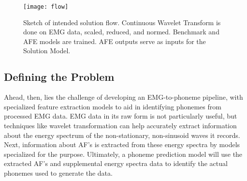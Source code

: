 \documentclass[conference]{IEEEtran}
\begin{document}

\begin{figure}[!t]
\centering
\texttt{[image: flow]}
\caption{Sketch of intended solution flow. Continuous Wavelet Transform is done on EMG data, scaled, reduced, and normed. Benchmark and AFE models are trained. AFE outputs serve as inputs for the Solution Model.}
\label{fig_flow}
\end{figure}

\subsection{Defining the Problem}
Ahead, then, lies the challenge of developing an EMG-to-phoneme pipeline, with specialized feature extraction models to aid in identifying phonemes from processed EMG data. EMG data in its raw form is not particularly useful, but techniques like wavelet transformation can help accurately extract information about the energy spectrum of the non-stationary, non-sinusoid waves it records. Next, information about AF's is extracted from these energy spectra by models specialized for the purpose. Ultimately, a phoneme prediction model will use the extracted AF's and supplemental energy spectra data to identify the actual phonemes used to generate the data.
\end{document}
